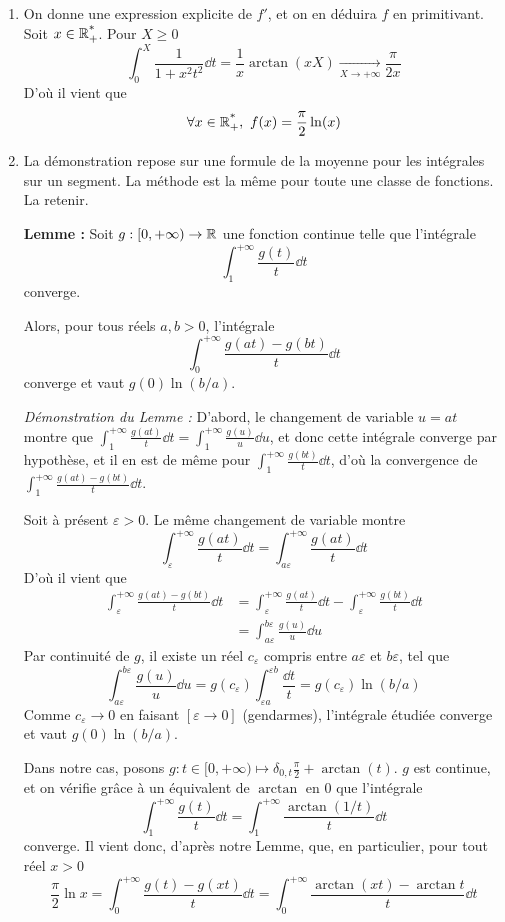 \begin{solution}
\begin{enumerate}
		\item On donne une expression explicite de $f'$, et on en déduira $f$ en primitivant. Soit $x\in\operatorname{\mathbb R_+^*}$.
		Pour $X\geq 0$
		\[
			\int_0^X\frac1{1+x^2t^2}\dd t=\frac1x\arctan(xX)\xrightarrow[X\to+\infty]{}\frac\pi{2x}
		\]
		D'où il vient que
		\[
			\forall x\in\Rpe,\ f(x)=\frac\pi2\ln(x)	
		\]

		\item La démonstration repose sur une formule de la moyenne pour les intégrales sur un segment.
		La méthode est la même pour toute une classe de fonctions. La retenir. 

		\textbf{Lemme :} Soit $g:[0,+\infty)\to \operatorname{\mathbb R}$ une fonction continue telle que l'intégrale
		\[
			\int_1^{+\infty}\frac{g(t)}t\dd t	
		\]
		converge. 

		Alors, pour tous réels $a,b>0$, l'intégrale 
		\[
			\int_0^{+\infty}\frac{g(at)-g(bt)}t\dd t	
		\]
		converge et vaut $g(0)\ln(b/a)$.

		\textit{Démonstration du Lemme :} 
		D'abord, le changement de variable $u=at$ montre que $\int_1^{+\infty}\frac{g(at)}t\dd t=\int_1^{+\infty}\frac{g(u)}u\dd u$,
		et donc cette intégrale converge par hypothèse, et il en est de même pour $\int_1^{+\infty}\frac{g(bt)}t\dd t$, 
		d'où la convergence de $\int_1^{+\infty}\frac{g(at)-g(bt)}t\dd t$.

		Soit à présent $\varepsilon > 0$. 
		Le même changement de variable montre 
		\[
			\int_\varepsilon^{+\infty} \frac{g(at)}t\dd t = \int_{a\varepsilon}^{+\infty}\frac{g(at)}t\dd t
		\]
		D'où il vient que 
		\begin{align*}
			\int_\varepsilon^{+\infty} \frac{g(at)-g(bt)}t\dd t &=\int_\varepsilon^{+\infty} \frac{g(at)}t\dd t-\int_\varepsilon^{+\infty} \frac{g(bt)}t\dd t\\
															   &=\int_{a\varepsilon}^{b\varepsilon} \frac{g(u)}u\dd u
		\end{align*}
		Par continuité de $g$, il existe un réel $c_\varepsilon$ compris entre $a\varepsilon$ et $b\varepsilon$, tel que 
		\[
			\int_{a\varepsilon}^{b\varepsilon} \frac{g(u)}u\dd u=g(c_\varepsilon)\int_{\varepsilon a}^{\varepsilon b}\frac{\dd t}t=g(c_\varepsilon)\ln(b/a)
		\]
		Comme $c_\varepsilon \to 0$ en faisant $[\varepsilon\to 0]$ (gendarmes), l'intégrale étudiée converge et vaut $g(0)\ln(b/a)$.


		Dans notre cas, posons $g:t\in[0,+\infty)\mapsto \delta_{0,t}\frac\pi2+\arctan(t)$.
		$g$ est continue, et on vérifie grâce à un équivalent de $\arctan$ en $0$ que l'intégrale 
		\[
			\int_1^{+\infty}\frac{g(t)}t\dd t = \int_1^{+\infty}\frac{\arctan(1/t)}t\dd t 
		\]
		converge.
		Il vient donc, d'après notre Lemme, que, en particulier, pour tout réel $x>0$
		\[
			\frac\pi2\ln x=\int_0^{+\infty}\frac{g(t)-g(xt)}t\dd t =\int_0^{+\infty}\frac{\arctan(xt)-\arctan t}t\dd t
		\]
	\end{enumerate}
\end{solution}

